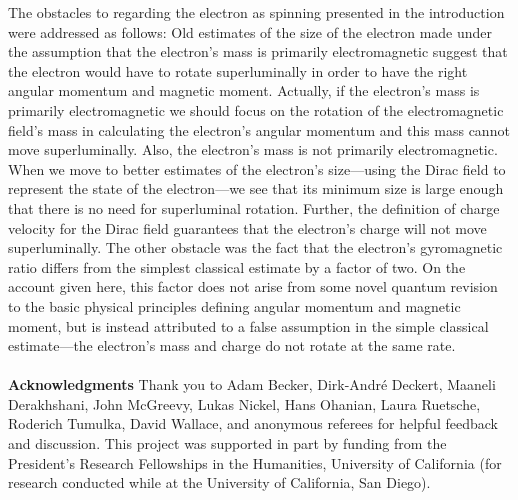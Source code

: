 \documentclass[onecolumn,secnumarabic,amsmath,amssymb,balancelastpage,nofootinbib]{article}
\begin{document}
The obstacles to regarding the electron as spinning presented in the introduction were addressed as follows:  Old estimates of the size of the electron made under the assumption that the electron's mass is primarily electromagnetic suggest that the electron would have to rotate superluminally in order to have the right angular momentum and magnetic moment.  Actually, if the electron's mass is primarily electromagnetic we should focus on the rotation of the electromagnetic field's mass in calculating the electron's angular momentum and this mass cannot move superluminally.  Also, the electron's mass is not primarily electromagnetic.  When we move to better estimates of the electron's size---using the Dirac field to represent the state of the electron---we see that its minimum size is large enough that there is no need for superluminal rotation.  Further, the definition of charge velocity for the Dirac field guarantees that the electron's charge will not move superluminally.  The other obstacle was the fact that the electron's gyromagnetic ratio differs from the simplest classical estimate by a factor of two.  On the account given here, this factor does not arise from some novel quantum revision to the basic physical principles defining angular momentum and magnetic moment, but is instead attributed to a false assumption in the simple classical estimate---the electron's mass and charge do not rotate at the same rate.\\\\


\textbf{Acknowledgments}
Thank you to Adam Becker, Dirk-Andr\'{e} Deckert, Maaneli Derakhshani, John McGreevy, Lukas Nickel, Hans Ohanian, Laura Ruetsche, Roderich Tumulka, David Wallace, and anonymous referees for helpful feedback and discussion.  This project was supported in part by funding from the President's Research Fellowships in the Humanities, University of California (for research conducted while at the University of California, San Diego).
\end{document}
